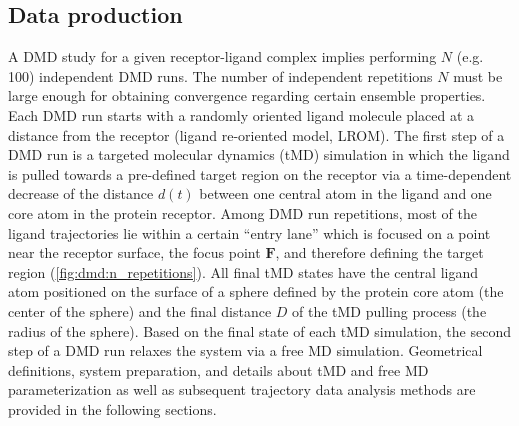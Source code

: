 \subsection{Data production}
\label{dmd:data_production}

A DMD study for a given receptor-ligand complex implies performing $N$ (e.g.
100) independent DMD runs. The number of independent repetitions $N$ must be
large enough for obtaining convergence regarding certain ensemble properties.
Each DMD run starts with a randomly oriented ligand molecule placed at a
distance from the receptor (ligand re-oriented model, LROM). The first step of a
DMD run is a targeted molecular dynamics (tMD) simulation in which the ligand is
pulled towards a pre-defined target region on the receptor via a time-dependent
decrease of the distance $d(t)$ between one central atom in the ligand and one
core atom in the protein receptor. Among DMD run repetitions, most of the ligand
trajectories lie within a certain \enquote{entry lane} which is focused on a
point near the receptor surface, the focus point $\bm{F}$, and therefore
defining the target region (\cref{fig:dmd:n_repetitions}). All final tMD states
have the central ligand atom positioned on the surface of a sphere defined by
the protein core atom (the center of the sphere) and the final distance $D$ of
the tMD pulling process (the radius of the sphere). Based on the final state of
each tMD simulation, the second step of a DMD run relaxes the system via a free
MD simulation. Geometrical definitions, system preparation, and details about
tMD and free MD parameterization as well as subsequent trajectory data analysis
methods are provided in the following sections.

